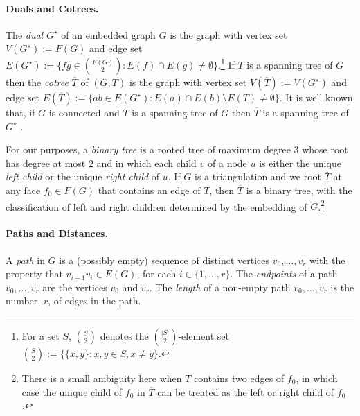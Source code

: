 \documentclass{patmorin}
\DeclareMathOperator{\dist}{dist}
\begin{document}
\paragraph*{Duals and Cotrees.}

The \emph{dual} $G^\star$ of an embedded graph $G$ is the graph with vertex set $V(G^\star):=F(G)$ and edge set $E(G^{\star}):=\{fg\in \binom{F(G)}{2}:E(f)\cap E(g)\neq\emptyset\}$.\footnote{For a set $S$, $\binom{S}{2}$ denotes the $\binom{|S|}{2}$-element set $\binom{S}{2}:=\{\{x,y\}:x,y\in S, x\neq y\}$.} If $T$ is a spanning tree of $G$ then the \emph{cotree} $\overline{T}$ of $(G,T)$ is the graph with vertex set $V(\overline{T}) := V(G^\star)$ and edge set $E(\overline{T}) := \{ab \in E(G^\star) : E(a) \cap E(b) \setminus E(T) \neq \emptyset \}$. It is well known that, if $G$ is connected and $T$ is a spanning tree of $G$ then $\overline{T}$ is a spanning tree of $G^\star$ \cite[Chapter~4, Exercise~42]{diestel:graph}.

For our purposes, a \emph{binary tree} is a rooted tree of maximum degree $3$ whose root has degree at most $2$ and in which each child $v$ of a node $u$ is either the unique \emph{left child} or the unique \emph{right child} of $u$.  If $G$ is a triangulation  and we root $\overline{T}$ at any face $f_0\in F(G)$ that contains an edge of $T$, then $\overline{T}$ is a binary tree, with the classification of left and right children determined by the embedding of $G$.\footnote{There is a small ambiguity here when $T$ contains two edges of $f_0$, in which case the unique child of $f_0$ in $\overline{T}$ can be treated as the left or right child of $f_0$.}

\paragraph*{Paths and Distances.}

A \emph{path} in $G$ is a (possibly empty) sequence of distinct vertices $v_0,\ldots,v_r$ with the property that $v_{i-1}v_i\in E(G)$, for each $i\in\{1,\ldots,r\}$.  The \emph{endpoints} of a path $v_0,\ldots,v_r$ are the vertices $v_0$ and $v_r$.
The \emph{length} of a non-empty path $v_0,\ldots,v_r$ is the number, $r$, of edges in the path.
%
\end{document}
